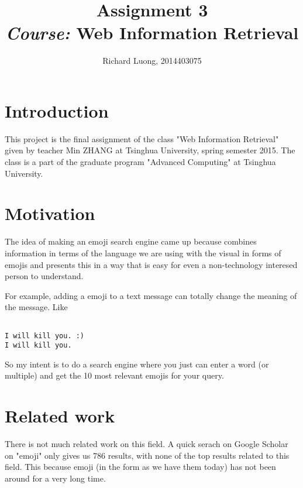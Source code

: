 \documentclass[a4paper]{article}
\author{Richard Luong, 2014403075}
\title{Assignment 3\\ 
\large \emph{Course: }Web Information Retrieval}
\begin{document}
\maketitle
\pagebreak
\tableofcontents
\pagebreak




\section{Introduction} %
\label{sec:introduction}

This project is the final assignment of the class "Web Information Retrieval" given by teacher Min ZHANG at Tsinghua University, spring semester 2015. The class is a part of the graduate program "Advanced Computing" at Tsinghua University.


\section{Motivation} %
\label{sec:motivation}

The idea of making an emoji search engine came up because combines information in terms of the language we are using with the visual in forms of emojis and presents this in a way that is easy for even a non-technology interesed person to understand.

For example, adding a emoji to a text message can totally change the meaning of the message. Like

\begin{verbatim}

I will kill you. :)
I will kill you.

\end{verbatim}
    
So my intent is to do a search engine where you just can enter a word (or multiple) and get the 10 most relevant emojis for your query.


\section{Related work} %
\label{sec:related_work}

There is not much related work on this field. A quick serach on Google Scholar on "emoji" only gives us 786 results, with none of the top results related to this field. This because emoji (in the form as we have them today) has not been around for a very long time.
\end{document}
